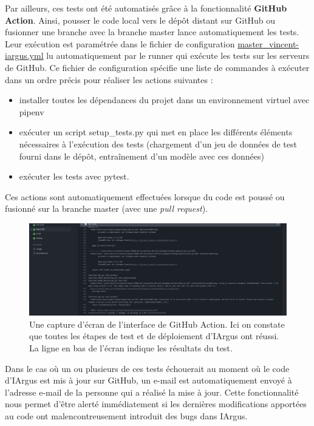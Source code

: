 \documentclass[french]{article}
\begin{document}
    Par ailleurs, ces tests ont été automatisés grâce à la fonctionnalité \textbf{GitHub Action}. Ainsi, pousser le code local vers le dépôt distant sur GitHub ou fusionner une branche avec la branche master lance automatiquement les tests. Leur exécution est paramétrée dans le fichier de configuration \href{https://github.com/vinpap/iargus/blob/8e63c88368532a1a424799e698f20b873ee2dc4f/.github/workflows/master_vincent-iargus.yml}{master\_vincent-iargus.yml} lu automatiquement par le runner qui exécute les tests sur les serveurs de GitHub. Ce fichier de configuration spécifie une liste de commandes à exécuter dans un ordre précis pour réaliser les actions suivantes :
    \begin{itemize}
        \item installer toutes les dépendances du projet dans un environnement virtuel avec pipenv
        \item exécuter un script setup\_tests.py qui met en place les différents éléments nécessaires à l'exécution des tests (chargement d'un jeu de données de test fourni dans le dépôt, entraînement d'un modèle avec ces données)
        \item exécuter les tests avec pytest.
    \end{itemize}

    Ces actions sont automatiquement effectuées lorsque du code est poussé ou fusionné sur la branche master (avec une \textit{pull request}).

    \begin{figure}[h!]
        \includegraphics[width=12cm]{gh_action}
        \centering
        \caption{Une capture d'écran de l'interface de GitHub Action. Ici on constate que toutes les étapes de test et de déploiement d'IArgus ont réussi. La ligne en bas de l'écran indique les résultats du test.}
    \end{figure}

    Dans le cas où un ou plusieurs de ces tests échouerait au moment où le code d'IArgus est mis à jour sur GitHub, un e-mail est automatiquement envoyé à l'adresse e-mail de la personne qui a réalisé la mise à jour. Cette fonctionnalité nous permet d'être alerté immédiatement si les dernières modifications apportées au code ont malencontreusement introduit des bugs dans IArgus.
\end{document}
